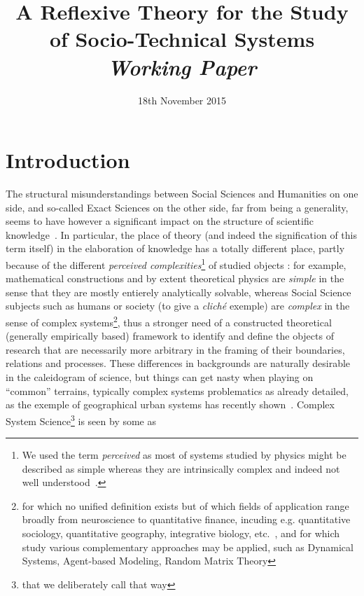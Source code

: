 


\title{
A Reflexive Theory for the Study of Socio-Technical Systems
\bigskip\\
\textit{Working Paper}
}
\author{}
\date{18th November 2015}


\maketitle

\justify


\begin{abstract}

\end{abstract}



\section*{Introduction}

The structural misunderstandings between Social Sciences and Humanities on one side, and so-called Exact Sciences on the other side, far from being a generality, seems to have however a significant impact on the structure of scientific knowledge~\cite{2015arXiv151103981H}. In particular, the place of theory (and indeed the signification of this term itself) in the elaboration of knowledge has a totally different place, partly because of the different \emph{perceived complexities}\footnote{We used the term \emph{perceived} as most of systems studied by physics might be described as simple whereas they are intrinsically complex and indeed not well understood~\cite{laughlin2006different}.} of studied objects : for example, mathematical constructions and by extent theoretical physics are \emph{simple} in the sense that they are mostly entierely analytically solvable, whereas Social Science subjects such as humans or society (to give a \emph{clich{\'e}} exemple) are \emph{complex} in the sense of complex systems\footnote{for which no unified definition exists but of which fields of application range broadly from neuroscience to quantitative finance, incuding e.g. quantitative sociology, quantitative geography, integrative biology, etc.~\cite{newman2011complex}, and for which study various complementary approaches may be applied, such as Dynamical Systems, Agent-based Modeling, Random Matrix Theory}, thus a stronger need of a constructed theoretical (generally empirically based) framework to identify and define the objects of research that are necessarily more arbitrary in the framing of their boundaries, relations and processes. %
These differences in backgrounds are naturally desirable in the caleidogram of science, but things can get nasty when playing on ``common'' terrains, typically complex systems problematics as already detailed, as the exemple of geographical urban systems has recently shown~\cite{dupuy2015sciences}. Complex System Science\footnote{that we deliberately call that way} is seen by some as 



